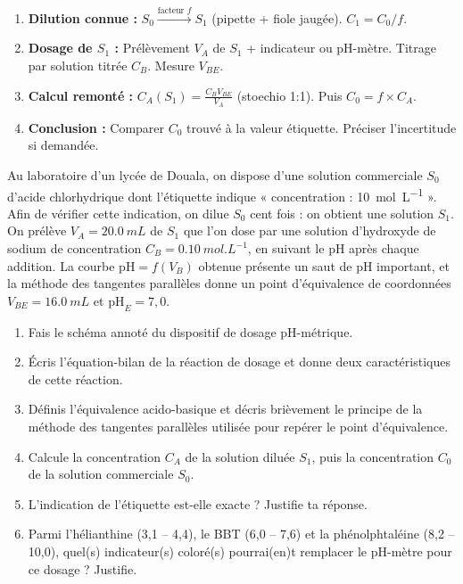 \documentclass[11pt]{article}
\newcounter{popsec}
\newcounter{popsub}
\newcommand{\courssub}[1]{%
  \stepcounter{popsub}%
  \par\vspace{9pt}\noindent{\popxbold\fontsize{11.5}{13}\selectfont\color{popink}{\color{poporange}\thepopsec.\thepopsub}\hspace{6pt}#1}\par\nopagebreak\vspace{4pt}
}
\begin{document}
\courssub{Je me prépare au Bac}

\begin{methode}
\begin{enumerate}
\item \textbf{Dilution connue :} $S_0 \xrightarrow{\text{facteur } f} S_1$ (pipette + fiole jaugée). $C_1 = C_0 / f$.
\item \textbf{Dosage de $S_1$ :} Prélèvement $V_A$ de $S_1$ + indicateur ou pH-mètre. Titrage par solution titrée $C_B$. Mesure $V_{BE}$.
\item \textbf{Calcul remonté :} $C_A (S_1) = \frac{C_B V_{BE}}{V_A}$ (stoechio 1:1). Puis $C_0 = f \times C_A$.
\item \textbf{Conclusion :} Comparer $C_0$ trouvé à la valeur étiquette. Préciser l'incertitude si demandée.
\end{enumerate}
\end{methode}

\begin{exercice}
Au laboratoire d'un lycée de Douala, on dispose d'une solution commerciale $S_0$ d'acide chlorhydrique dont l'étiquette indique « concentration : \SI{10}{mol.L^{-1}} ». Afin de vérifier cette indication, on dilue $S_0$ cent fois : on obtient une solution $S_1$. On prélève $V_A = \SI{20,0}{mL}$ de $S_1$ que l'on dose par une solution d'hydroxyde de sodium de concentration $C_B = \SI{0,10}{mol.L^{-1}}$, en suivant le pH après chaque addition. La courbe $\mathrm{pH} = f(V_B)$ obtenue présente un saut de pH important, et la méthode des tangentes parallèles donne un point d'équivalence de coordonnées $V_{BE} = \SI{16,0}{mL}$ et $\mathrm{pH}_E = 7,0$.
\begin{enumerate}
\item Fais le schéma annoté du dispositif de dosage pH-métrique.
\item Écris l'équation-bilan de la réaction de dosage et donne deux caractéristiques de cette réaction.
\item Définis l'équivalence acido-basique et décris brièvement le principe de la méthode des tangentes parallèles utilisée pour repérer le point d'équivalence.
\item Calcule la concentration $C_A$ de la solution diluée $S_1$, puis la concentration $C_0$ de la solution commerciale $S_0$.
\item L'indication de l'étiquette est-elle exacte ? Justifie ta réponse.
\item Parmi l'hélianthine (3,1 -- 4,4), le BBT (6,0 -- 7,6) et la phénolphtaléine (8,2 -- 10,0), quel(s) indicateur(s) coloré(s) pourrai(en)t remplacer le pH-mètre pour ce dosage ? Justifie.
\end{enumerate}
\end{exercice}
\end{document}
